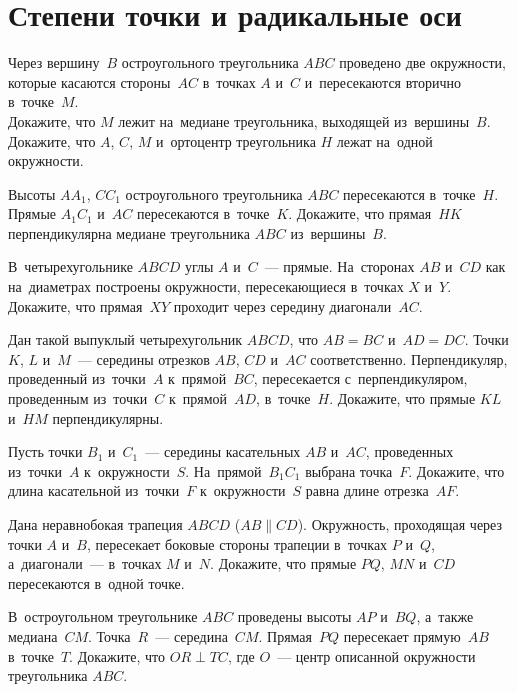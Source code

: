 
\section*{Степени точки и радикальные оси}


\begin{problems}

\item
Через вершину~$B$ остроугольного треугольника $ABC$ проведено две окружности,
которые касаются стороны~$AC$ в~точках $A$ и~$C$ и~пересекаются вторично
в~точке~$M$.
\\
\sp
Докажите, что $M$ лежит на~медиане треугольника, выходящей из~вершины~$B$.
\\
\sp
Докажите, что $A$, $C$, $M$ и~ортоцентр треугольника $H$ лежат на~одной
окружности.

\item
Высоты $A A_1$, $C C_1$ остроугольного треугольника $ABC$ пересекаются
в~точке~$H$.
Прямые $A_1 C_1$ и~$AC$ пересекаются в~точке~$K$.
Докажите, что прямая~$HK$ перпендикулярна медиане треугольника $ABC$
из~вершины~$B$.

\item
В~четырехугольнике $ABCD$ углы $A$ и~$C$~--- прямые.
На~сторонах $AB$ и~$CD$ как на~диаметрах построены окружности, пересекающиеся
в~точках $X$ и~$Y$.
Докажите, что прямая~$XY$ проходит через середину диагонали~$AC$.

\item
Дан такой выпуклый четырехугольник $ABCD$, что $AB = BC$ и~$AD = DC$.
Точки $K$, $L$ и~$M$~--- середины отрезков $AB$, $CD$ и~$AC$ соответственно.
Перпендикуляр, проведенный из~точки~$A$ к~прямой~$BC$, пересекается
с~перпендикуляром, проведенным из~точки~$C$ к~прямой~$AD$, в~точке~$H$.
Докажите, что прямые $KL$ и~$HM$ перпендикулярны.

\item
Пусть точки $B_1$ и~$C_1$~--- середины касательных $AB$ и~$AC$, проведенных
из~точки~$A$ к~окружности~$S$.
На~прямой~$B_1 C_1$ выбрана точка~$F$.
Докажите, что длина касательной из~точки~$F$ к~окружности~$S$ равна длине
отрезка~$AF$.

\item
Дана неравнобокая трапеция $ABCD$ ($AB \parallel CD$).
Окружность, проходящая через точки $A$ и~$B$, пересекает боковые стороны
трапеции в~точках $P$ и~$Q$, а~диагонали~--- в~точках $M$ и~$N$.
Докажите, что прямые $PQ$, $MN$ и~$CD$ пересекаются в~одной точке.

\item
В~остроугольном треугольнике $ABC$ проведены высоты $AP$ и~$BQ$, а~также
медиана~$CM$.
Точка~$R$~--- середина~$CM$.
Прямая~$PQ$ пересекает прямую~$AB$ в~точке~$T$.
Докажите, что $OR \perp TC$, где $O$~--- центр описанной окружности
треугольника $ABC$.

\end{problems}

